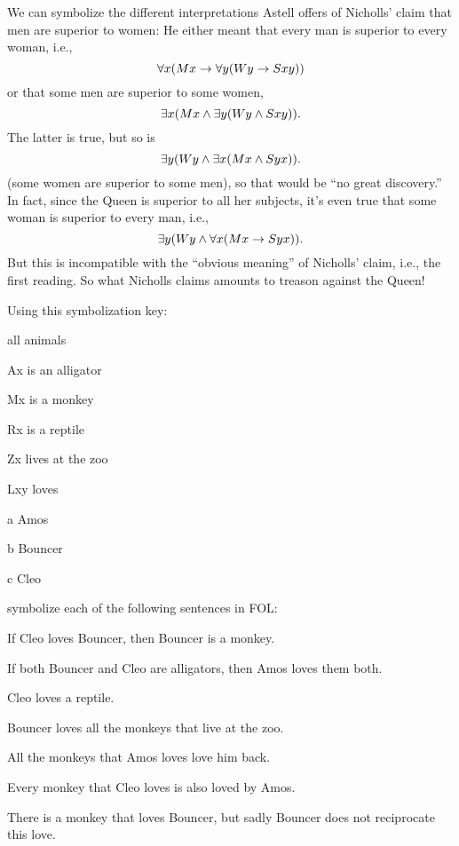 We can symbolize the different interpretations Astell offers of
Nicholls' claim that men are superior to women:
He either meant that every man is superior to every woman, i.e.,
\[
\forall x(Mx \rightarrow \forall y(Wy \rightarrow Sxy))
\]
or that some men are superior to some women,
\[
\exists x(Mx \wedge \exists y(Wy \wedge Sxy)).
\]
The latter is true, but so is
\[
\exists y(Wy \wedge \exists x(Mx \wedge Syx)).
\]
(some women are superior to some men), so that would be ``no great
discovery.''  In fact, since the Queen is superior to all her
subjects, it's even true that some woman is superior to every man,
i.e.,
\[
\exists y(Wy \land \forall x(Mx \rightarrow Syx)).
\]
But this is incompatible with the ``obvious meaning'' of Nicholls'
claim, i.e., the first reading. So what Nicholls claims amounts to
treason against the Queen!

\practiceproblems
\solutions
\problempart
Using this symbolization key:
\begin{ekey}
\item[\text{domain}] all animals
\item[Ax]  is an alligator
\item[Mx]  is a monkey
\item[Rx]  is a reptile
\item[Zx]  lives at the zoo
\item[Lxy]  loves 
\item[a] Amos
\item[b] Bouncer
\item[c] Cleo
\end{ekey}
symbolize each of the following sentences in FOL:
\begin{earg}
\item If Cleo loves Bouncer, then Bouncer is a monkey. 
\item If both Bouncer and Cleo are alligators, then Amos loves them both.
\item Cleo loves a reptile.
\item Bouncer loves all the monkeys that live at the zoo.
\item All the monkeys that Amos loves love him back.
\item Every monkey that Cleo loves is also loved by Amos.
\item There is a monkey that loves Bouncer, but sadly Bouncer does not reciprocate this love.
\end{earg}


